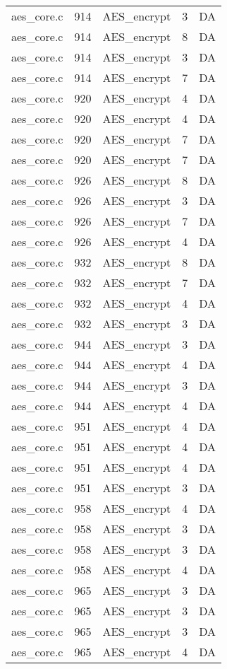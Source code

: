 \begin{table}
\begin{tabular}{clrrr}
aes\_core.c& 914&AES\_encrypt&3 &DA\\
aes\_core.c& 914&AES\_encrypt&8 &DA\\
aes\_core.c& 914&AES\_encrypt&3 &DA\\
aes\_core.c& 914&AES\_encrypt&7 &DA\\
aes\_core.c& 920&AES\_encrypt&4 &DA\\
aes\_core.c& 920&AES\_encrypt&4 &DA\\
aes\_core.c& 920&AES\_encrypt&7 &DA\\
aes\_core.c& 920&AES\_encrypt&7 &DA\\
aes\_core.c& 926&AES\_encrypt&8 &DA\\
aes\_core.c& 926&AES\_encrypt&3 &DA\\
aes\_core.c& 926&AES\_encrypt&7 &DA\\
aes\_core.c& 926&AES\_encrypt&4 &DA\\
aes\_core.c& 932&AES\_encrypt&8 &DA\\
aes\_core.c& 932&AES\_encrypt&7 &DA\\
aes\_core.c& 932&AES\_encrypt&4 &DA\\
aes\_core.c& 932&AES\_encrypt&3 &DA\\
aes\_core.c& 944&AES\_encrypt&3 &DA\\
aes\_core.c& 944&AES\_encrypt&4 &DA\\
aes\_core.c& 944&AES\_encrypt&3 &DA\\
aes\_core.c& 944&AES\_encrypt&4 &DA\\
aes\_core.c& 951&AES\_encrypt&4 &DA\\
aes\_core.c& 951&AES\_encrypt&4 &DA\\
aes\_core.c& 951&AES\_encrypt&4 &DA\\
aes\_core.c& 951&AES\_encrypt&3 &DA\\
aes\_core.c& 958&AES\_encrypt&4 &DA\\
aes\_core.c& 958&AES\_encrypt&3 &DA\\
aes\_core.c& 958&AES\_encrypt&3 &DA\\
aes\_core.c& 958&AES\_encrypt&4 &DA\\
aes\_core.c& 965&AES\_encrypt&3 &DA\\
aes\_core.c& 965&AES\_encrypt&3 &DA\\
aes\_core.c& 965&AES\_encrypt&3 &DA\\
aes\_core.c& 965&AES\_encrypt&4 &DA\\
\hline
\end{tabular}
\end{table}